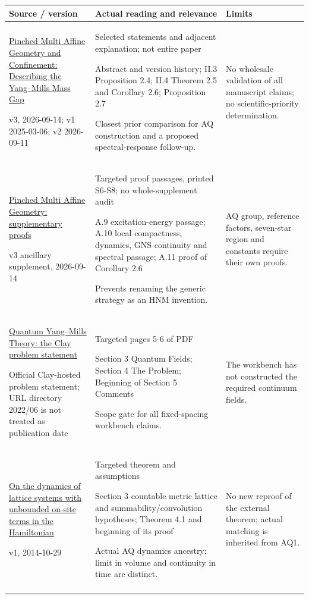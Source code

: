 \begin{longtable}{@{}p{43mm}p{65mm}p{44mm}@{}}
\toprule Source / version & Actual reading and relevance & Limits\\\midrule\endhead
\href{https://arxiv.org/html/2503.15539v3}{Pinched Multi Affine Geometry and Confinement: Describing the Yang--Mills Mass Gap}\par v3, 2026-09-14; v1 2025-03-06; v2 2026-09-11 & Selected statements and adjacent explanation; not entire paper\par Abstract and version history; II.3 Proposition 2.4; II.4 Theorem 2.5 and Corollary 2.6; Proposition 2.7\par Closest prior comparison for AQ construction and a proposed spectral-response follow-up. & No wholesale validation of all manuscript claims; no scientific-priority determination.\\\addlinespace
\href{https://arxiv.org/src/2503.15539v3/anc/PinchedMultiAffineGeometry_Supplement.pdf}{Pinched Multi Affine Geometry: supplementary proofs}\par v3 ancillary supplement, 2026-09-14 & Targeted proof passages, printed S6-S8; no whole-supplement audit\par A.9 excitation-energy passage; A.10 local compactness, dynamics, GNS continuity and spectral passage; A.11 proof of Corollary 2.6\par Prevents renaming the generic strategy as an HNM invention. & AQ group, reference factors, seven-star region and constants require their own proofs.\\\addlinespace
\href{https://www.claymath.org/wp-content/uploads/2022/06/yangmills.pdf}{Quantum Yang--Mills Theory: the Clay problem statement}\par Official Clay-hosted problem statement; URL directory 2022/06 is not treated as publication date & Targeted pages 5-6 of PDF\par Section 3 Quantum Fields; Section 4 The Problem; Beginning of Section 5 Comments\par Scope gate for all fixed-spacing workbench claims. & The workbench has not constructed the required continuum fields.\\\addlinespace
\href{https://arxiv.org/pdf/1410.8174}{On the dynamics of lattice systems with unbounded on-site terms in the Hamiltonian}\par v1, 2014-10-29 & Targeted theorem and assumptions\par Section 3 countable metric lattice and summability/convolution hypotheses; Theorem 4.1 and beginning of its proof\par Actual AQ dynamics ancestry; limit in volume and continuity in time are distinct. & No new reproof of the external theorem; actual matching is inherited from AQ1.\\\addlinespace

\end{longtable}
